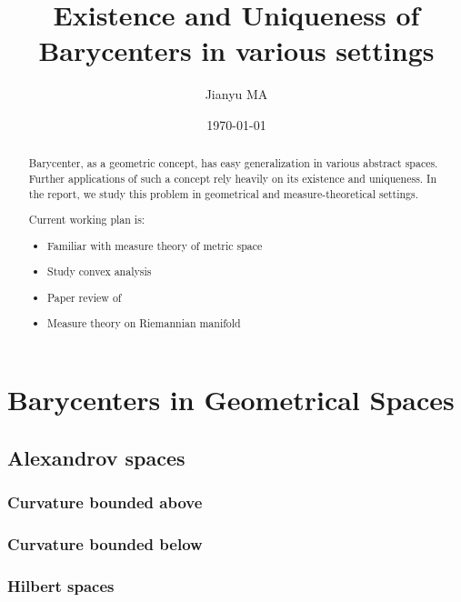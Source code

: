 \documentclass{report}
\title{Existence and Uniqueness of Barycenters in various settings}
\author{Jianyu MA}
\date{\today}
\theoremstyle{remark}
\theoremstyle{definition}
\begin{document}
\maketitle

\begin{abstract}
	Barycenter, as a geometric concept, has easy generalization in various abstract spaces. Further applications of such a concept rely heavily on its existence and uniqueness. In the report, we study this problem in geometrical and measure-theoretical settings.

	Current working plan is:
	\begin{itemize}
		\item Familiar with measure theory of metric space
		\item Study convex analysis
		\item Paper review of \cite{KIM2017640}
		\item Measure theory on Riemannian manifold
	\end{itemize}
\end{abstract}

\tableofcontents
{}


\part{Barycenters in Geometrical Spaces}



\chapter{Alexandrov spaces}
\section{Curvature bounded above}
\section{Curvature bounded below}
\section{Hilbert spaces}
\end{document}

